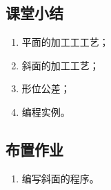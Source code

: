\subsection{课堂小结}
\begin{enumerate}[1、]
	\item 平面的加工工工艺；
	\item 斜面的加工工艺；
	\item 形位公差；
	\item 编程实例。
\end{enumerate}

\vfill
\subsection{布置作业}
\begin{enumerate}[1、]
	\item 编写斜面的程序。
\end{enumerate}
\vfill